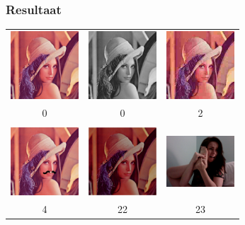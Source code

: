 \documentclass{beamer}
\begin{document}
\begin{frame}
  \frametitle{Resultaat}

  \centering

  \begin{tabular}{ccc}
    \includegraphics[height=1in,width=1in,keepaspectratio]{../images/60.png} &
    \includegraphics[height=1in,width=1in,keepaspectratio]{../images/62.jpg} &
    \includegraphics[height=1in,width=1in,keepaspectratio]{../images/61.jpg} \\
    0 & 0 & 2 \\&&\\
    \includegraphics[height=1in,width=1in,keepaspectratio]{../images/64.jpg} &
    \includegraphics[height=1in,width=1in,keepaspectratio]{../images/63.jpg} &
    \includegraphics[height=1in,width=1in,keepaspectratio]{../images/32.jpg} \\
    4 & 22 & 23
  \end{tabular}

\end{frame}
\end{document}
